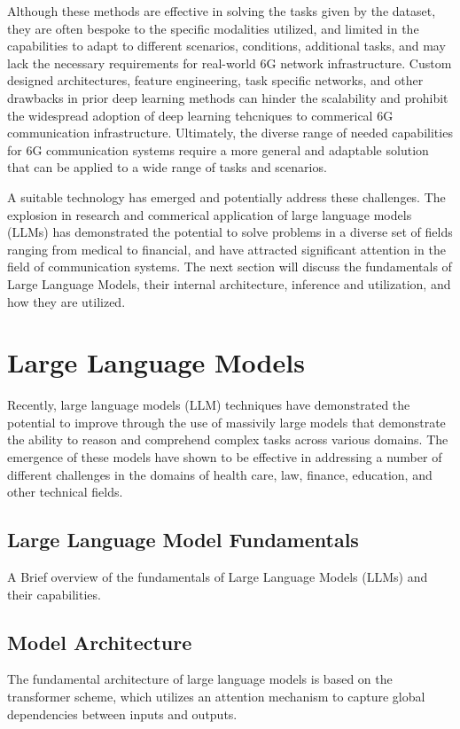 
Although these methods are effective in solving the tasks given by the dataset, they are often bespoke to the specific modalities utilized, and limited in the capabilities to adapt to different scenarios, conditions, additional tasks, and may lack the necessary requirements for real-world 6G network infrastructure. Custom designed architectures, feature engineering, task specific networks, and other drawbacks in prior deep learning methods can hinder the scalability and prohibit the widespread adoption of deep learning tehcniques to commerical 6G communication infrastructure. Ultimately, the diverse range of needed capabilities for 6G communication systems require a more general and adaptable solution that can be applied to a wide range of tasks and scenarios.

A suitable technology has emerged and potentially address these challenges. The explosion in research and commerical application of large language models (LLMs) has demonstrated the potential to solve problems in a diverse set of fields ranging from medical to financial, and have attracted significant attention in the field of communication systems. The next section will discuss the fundamentals of Large Language Models, their internal architecture, inference and utilization, and how they are utilized. 

\section{Large Language Models}

Recently, large language models (LLM) techniques have demonstrated the potential to improve through the use of massivily large models that demonstrate the ability to reason and comprehend complex tasks across various domains. The emergence of these models have shown to be effective in addressing a number of different challenges in the domains of health care, law, finance, education, and other technical fields.%
 
\subsection{Large Language Model Fundamentals}
A Brief overview of the fundamentals of Large Language Models (LLMs) and their capabilities.

\subsection{Model Architecture}
The fundamental architecture of large language models is based on the transformer scheme, which utilizes an attention mechanism to capture global dependencies between inputs and outputs. 

